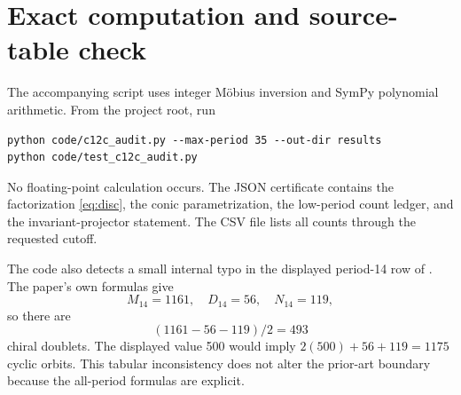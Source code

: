 \section{Exact computation and source-table check}

The accompanying script uses integer M\"obius inversion and SymPy polynomial
arithmetic.  From the project root, run
\begin{verbatim}
python code/c12c_audit.py --max-period 35 --out-dir results
python code/test_c12c_audit.py
\end{verbatim}
No floating-point calculation occurs.  The JSON certificate contains the
factorization \eqref{eq:disc}, the conic parametrization, the low-period count
ledger, and the invariant-projector statement.  The CSV file lists all counts
through the requested cutoff.

The code also detects a small internal typo in the displayed period-14 row of
\citet{gallas2007}.  The paper's own formulas give
\begin{equation}
M_{14}=1161,\quad D_{14}=56,\quad N_{14}=119,
\end{equation}
so there are
\begin{equation}
(1161-56-119)/2=493
\end{equation}
chiral doublets.  The displayed value 500 would imply
$2(500)+56+119=1175$ cyclic orbits.  This tabular inconsistency does not alter
the prior-art boundary because the all-period formulas are explicit.

